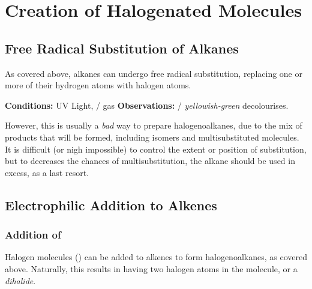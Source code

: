 	\section{Creation of Halogenated Molecules}

		\subsection{Free Radical Substitution of Alkanes}

			As covered above, alkanes can undergo free radical substitution, replacing one or more of their hydrogen atoms with halogen
			atoms.

			\vspace{1.5em}

			\vbox{\textbf{Conditions:} \tabto{35mm}UV Light,  /  gas}
			\vbox{\textbf{Observations:} \tabto{35mm}  / \textit{\color{YellowGreen}yellowish-green}  decolourises.}


			However, this is usually a \textit{bad} way to prepare halogenoalkanes, due to the mix of products that will be formed, including
			isomers and multisubstituted molecules. It is difficult (or nigh impossible) to control the extent or position of substitution,
			but to decreases the chances of multisubstitution, the alkane should be used in excess, as a last resort.



		\pagebreak
		\subsection{Electrophilic Addition to Alkenes}

			\subsubsection{Addition of }

				Halogen molecules () can be added to alkenes to form halogenoalkanes, as covered above. Naturally, this results in
				having two halogen atoms in the molecule, or a \textit{dihalide}.

